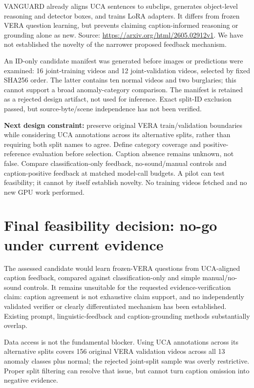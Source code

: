 \documentclass[11pt]{article}
\begin{document}
VANGUARD already aligns UCA sentences to subclips, generates object-level reasoning and detector boxes, and trains LoRA adapters. It differs from frozen VERA question learning, but prevents claiming caption-informed reasoning or grounding alone as new. Source: \url{https://arxiv.org/html/2605.02912v1}. We have not established the novelty of the narrower proposed feedback mechanism.

An ID-only candidate manifest was generated before images or predictions were examined: 16 joint-training videos and 12 joint-validation videos, selected by fixed SHA256 order. The latter contains ten normal videos and two burglaries; this cannot support a broad anomaly-category comparison. The manifest is retained as a rejected design artifact, not used for inference. Exact split-ID exclusion passed, but source-byte/scene independence has not been verified.

\textbf{Next design constraint:} preserve original VERA train/validation boundaries while considering UCA annotations across its alternative splits, rather than requiring both split names to agree. Define category coverage and positive-reference evaluation before selection. Caption absence remains unknown, not false. Compare classification-only feedback, no-sound/manual controls and caption-positive feedback at matched model-call budgets. A pilot can test feasibility; it cannot by itself establish novelty. No training videos fetched and no new GPU work performed.


\section{Final feasibility decision: no-go under current evidence}
The assessed candidate would learn frozen-VERA questions from UCA-aligned caption feedback, compared against classification-only and simple manual/no-sound controls. It remains unsuitable for the requested evidence-verification claim: caption agreement is not exhaustive claim support, and no independently validated verifier or clearly differentiated mechanism has been established. Existing prompt, linguistic-feedback and caption-grounding methods substantially overlap.

Data access is not the fundamental blocker. Using UCA annotations across its alternative splits covers 156 original VERA validation videos across all 13 anomaly classes plus normal; the rejected joint-split sample was overly restrictive. Proper split filtering can resolve that issue, but cannot turn caption omission into negative evidence.
\end{document}
